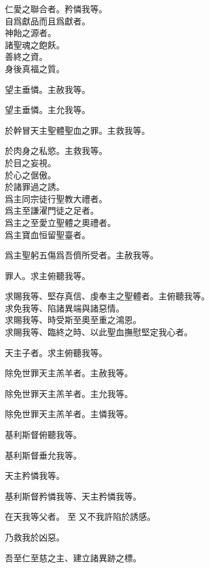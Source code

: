 \versicle 仁愛之聯合者。\hfill \response 矜憐我等。\\
自爲獻品而且爲獻者。\\
神飴之源者。\\
諸聖魂之飽飫。\\
善終之資。\\
身後真福之質。

\versicle 望主垂憐。\hfill \response 主赦我等。

\versicle 望主垂憐。\hfill \response 主允我等。

\versicle 於幹冒天主聖體聖血之罪。\hfill \response 主救我等。

\versicle 於肉身之私慾。\hfill \response 主救我等。\\
於目之妄視。\\
於心之倨傲。\\
於諸罪過之誘。\\
爲主同宗徒行聖教大禮者。\\
爲主至謙濯門徒之足者。\\
爲主之至愛立聖體之奧禮者。\\
爲主寶血恒留聖臺者。

\versicle 爲主聖躬五傷爲吾儕所受者。\hfill \response 主赦我等。

\versicle 罪人。\hfill \response 求主俯聽我等。

\versicle 求賜我等、堅存真信、虔奉主之聖體者。\hfill \response 主俯聽我等。\\
求免我等、陷諸異端與諸惡情。\\
求賜我等、時受斯至奧至重之鴻恩。\\
求賜我等、臨終之時、以此聖血撫慰堅定我心者。

\versicle 天主子者。\hfill \response 求主俯聽我等。

\versicle 除免世罪天主羔羊者。\hfill \response 主赦我等。

\versicle 除免世罪天主羔羊者。\hfill \response 主允我等。

\versicle 除免世罪天主羔羊者。\hfill \response 主憐我等。

\versicle 基利斯督俯聽我等。

\Response 基利斯督垂允我等。

\versicle 天主矜憐我等。

\Response 基利斯督矜憐我等、天主矜憐我等。

\versicle 在天我等父者。 至 又不我許陷於誘感。

\Response 乃救我於凶惡。

\versicle 吾至仁至慈之主、建立諸異跡之標。

